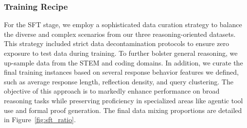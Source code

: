 


\subsubsection{Training Recipe}
For the SFT stage, we employ a sophisticated data curation strategy to balance the diverse and complex scenarios from our three reasoning-oriented datasets. 
This strategy included strict data decontamination protocols to ensure zero exposure to test data during training. 
To further bolster general reasoning, we up-sample data from the STEM and coding domains. 
In addition, we curate the final training instances based on several response behavior features we defined, such as average response length, reflection density, and query clustering. 
The objective of this approach is to markedly enhance performance on broad reasoning tasks while preserving proficiency in specialized areas like agentic tool use and formal proof generation. 
The final data mixing proportions are detailed in Figure~\ref{fig:sft_ratio}.

